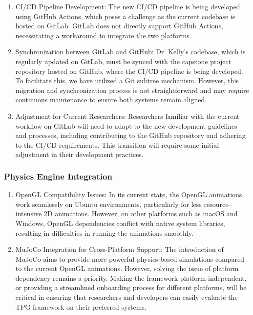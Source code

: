 \documentclass[12pt]{article}
\begin{document}
\begin{enumerate}
  \item CI/CD Pipeline Development: The new CI/CD pipeline is being developed using GitHub Actions, which poses a challenge as the current codebase is hosted on GitLab. GitLab does not directly support GitHub Actions, necessitating a workaround to integrate the two platforms.
  \item Synchronization between GitLab and GitHub: Dr. Kelly’s codebase, which is regularly updated on GitLab, must be synced with the capstone project repository hosted on GitHub, where the CI/CD pipeline is being developed. To facilitate this, we have utilized a Git subtree mechanism. However, this migration and synchronization process is not straightforward and may require continuous maintenance to ensure both systems remain aligned.
  \item Adjustment for Current Researchers: Researchers familiar with the current workflow on GitLab will need to adapt to the new development guidelines and processes, including contributing to the GitHub repository and adhering to the CI/CD requirements. This transition will require some initial adjustment in their development practices.
\end{enumerate}

\subsubsection{Physics Engine Integration}
\begin{enumerate}
  \item OpenGL Compatibility Issues: In its current state, the OpenGL animations work seamlessly on Ubuntu environments, particularly for less resource-intensive 2D animations. However, on other platforms such as macOS and Windows, OpenGL dependencies conflict with native system libraries, resulting in difficulties in running the animations smoothly.
  \item MuJoCo Integration for Cross-Platform Support: The introduction of MuJoCo aims to provide more powerful physics-based simulations compared to the current OpenGL animations. However, solving the issue of platform dependency remains a priority. Making the framework platform-independent, or providing a streamlined onboarding process for different platforms, will be critical in ensuring that researchers and developers can easily evaluate the TPG framework on their preferred systems.
\end{enumerate}
\end{document}
